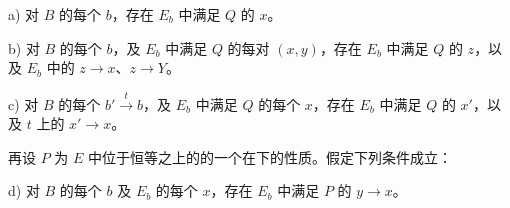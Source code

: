  a) 对 $B$ 的每个 $b$，存在 $E_b$ 中满足 $Q$ 的 $x$。

 b) 对 $B$ 的每个 $b$，及 $E_b$ 中满足 $Q$ 的每对 $(x,y)$，存在 $E_b$ 中满足 $Q$ 的 $z$，以及 $E_b$ 中的 $z\to x$、$z\to Y$。

 c) 对 $B$ 的每个 $b'\xrightarrow{t}b$，及 $E_b$ 中满足 $Q$ 的每个 $x$，存在 $E_b$ 中满足 $Q$ 的 $x'$，以及 $t$ 上的 $x'\to x$。

再设 $P$ 为 $E$ 中位于恒等之上的的一个在下的性质。假定下列条件成立：

 d) 对 $B$ 的每个 $b$ 及 $E_b$ 的每个 $x$，存在 $E_b$ 中满足 $P$ 的 $y\to x$。

